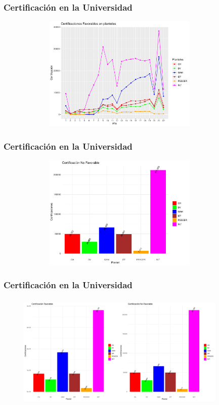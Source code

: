 \documentclass[xcolor=dvipsnames]{beamer}
\begin{document}
\begin{frame}\frametitle{Certificaci\'on en la Universidad}
\textbf{
}
\begin{figure}[H]
\centering
\includegraphics[width=10cm,height=5.5cm]{Imagenes/graficoCertFnF.pdf}
\end{figure}
\end{frame}


\begin{frame}\frametitle{Certificaci\'on en la Universidad}
\textbf{
}
\begin{figure}[H]
\centering
\includegraphics[width=10cm,height=5.5cm]{Imagenes/graficoCertificacionPlantelFnF.pdf}
\end{figure}
\end{frame}




\begin{frame}\frametitle{Certificaci\'on en la Universidad}
\textbf{
}
\begin{figure}[H]
\centering
\includegraphics[width=10cm,height=5.5cm]{Imagenes/graficoCertificacionPlantelesFnF.pdf}
\end{figure}
\end{frame}
\end{document}
